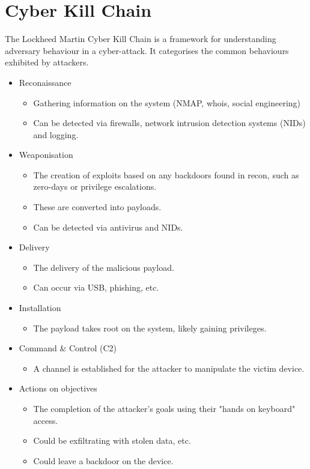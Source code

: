 \documentclass[12pt]{report}
\begin{document}
\pagebreak

\section{Cyber Kill Chain}
The Lockheed Martin Cyber Kill Chain is a framework for understanding adversary behaviour in a cyber-attack. It categorises 
the common behaviours exhibited by attackers.

\begin{itemize}
	\item Reconaissance
	\begin{itemize}
		\item Gathering information on the system (NMAP, whois, social engineering)
		\item Can be detected via firewalls, network intrusion detection systems (NIDs) and logging.
	\end{itemize}
	\item Weaponisation
	\begin{itemize}
		\item The creation of exploits based on any backdoors found in recon, such as zero-days or privilege escalations.
		\item These are converted into payloads.
		\item Can be detected via antivirus and NIDs.
	\end{itemize}
	\item Delivery
	\begin{itemize}
		\item The delivery of the malicious payload.
		\item Can occur via USB, phishing, etc.
	\end{itemize}
	\item Installation
	\begin{itemize}
		\item The payload takes root on the system, likely gaining privileges.
	\end{itemize}
	\item Command \& Control (C2)
	\begin{itemize}
		\item A channel is established for the attacker to manipulate the victim device.
	\end{itemize}
	\item Actions on objectives
	\begin{itemize}
		\item The completion of the attacker's goals using their "hands on keyboard" access.
		\item Could be exfiltrating with stolen data, etc.
		\item Could leave a backdoor on the device.
	\end{itemize}
\end{itemize}
\end{document}
